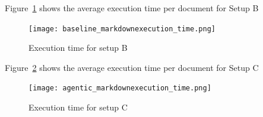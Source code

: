 Figure~\ref{fig:baseline_markdownexecution_time} shows the average execution time
per document for Setup B

\begin{figure}[H]
  \centering
  \texttt{[image: baseline\_markdownexecution\_time.png]}
    \caption{Execution time for setup B}
  \label{fig:baseline_markdownexecution_time}
\end{figure}

Figure~\ref{fig:agentic_markdownexecution_time} shows the average execution
time per document for Setup C

\begin{figure}[H]
  \centering
  \texttt{[image: agentic\_markdownexecution\_time.png]}
    \caption{Execution time for setup C}
  \label{fig:agentic_markdownexecution_time}
\end{figure}

